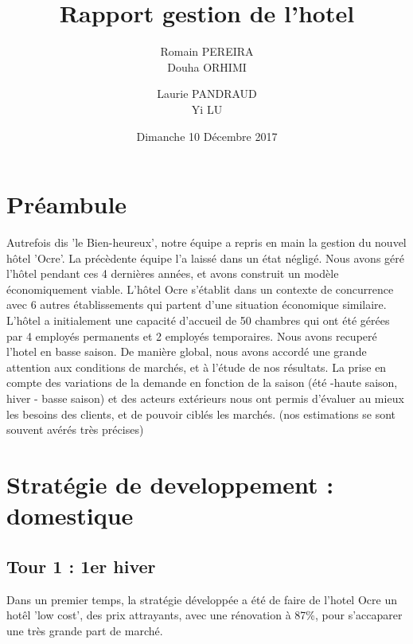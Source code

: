 \documentclass[a4paper,10pt]{article}
\title{Rapport gestion de l'hotel}
\author{
  Romain PEREIRA\\
  \newline
  Douha ORHIMI\\
  \and
  Laurie PANDRAUD\\
  \newline
  Yi LU\\
}
\date{Dimanche 10 Décembre 2017}
\begin{document}
\maketitle
\tableofcontents
  \section{Préambule}
    Autrefois dis 'le Bien-heureux', notre équipe a repris en main la gestion du nouvel hôtel 'Ocre'. La précèdente équipe l'a laissé dans un état négligé.
    Nous avons géré l'hôtel pendant ces 4 dernières années, et avons construit un modèle économiquement viable.
    \newline
    \newline
    L’hôtel Ocre s’établit dans un contexte de concurrence avec 6 autres établissements qui partent d’une situation économique similaire.
    L’hôtel a initialement une capacité d’accueil de 50 chambres qui ont été gérées par 4 employés permanents et 2 employés temporaires.
    Nous avons recuperé l'hotel en basse saison.
    \newline
    \newline
    De manière global, nous avons accordé une grande attention aux conditions de marchés, et à l'étude de nos résultats.
    La prise en compte des variations de la demande en fonction de la saison
    (été -haute saison, hiver - basse saison) et des acteurs extérieurs nous ont permis d’évaluer
    au mieux les besoins des clients, et de pouvoir ciblés les marchés. (nos estimations se sont souvent avérés très précises)
  \newpage
  \section{Stratégie de developpement : domestique}
    \subsection{Tour 1 : 1er hiver}      
      Dans un premier temps, la stratégie développée a été de faire de l’hotel Ocre un hotêl 'low cost',
      des prix attrayants, avec une rénovation à 87\%, pour s’accaparer une très grande part de marché.
      
      
\end{document}
